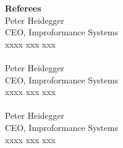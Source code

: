 \documentclass[a4paper]{article}
\newcommand{\mytitle}[1]{{\Large \textbf{#1}} \vspace{0.2cm}}
\begin{document}
\begin{minipage}[t]{0.3\linewidth}
    \vspace{0.5cm}
    {
        \mytitle{Referees}\\
        Peter Heidegger\\
        CEO, Improformance Systems \\
        xxxx xxx xxx\\
        \\
        Peter Heidegger\\
        CEO, Improformance Systems \\
        xxxx xxx xxx\\
        \\
        Peter Heidegger\\
        CEO, Improformance Systems \\
        xxxx xxx xxx\\
    }
%
%
\end{minipage}
%
\end{document}
